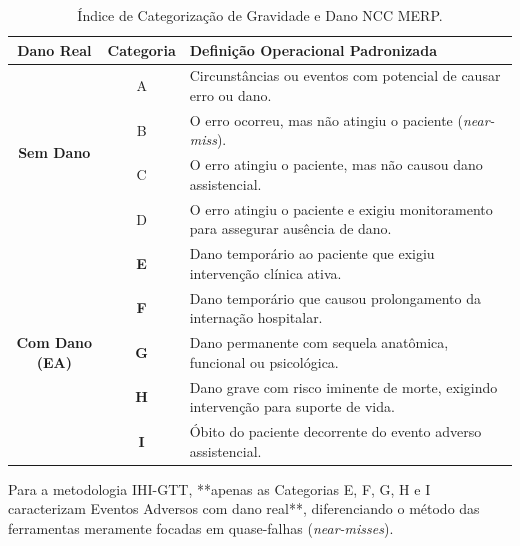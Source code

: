 \begin{table}[htb]
\centering
\caption{Índice de Categorização de Gravidade e Dano NCC MERP.}
\label{tab_ncc_merp}
\begin{tabularx}{\textwidth}{c c X}
\toprule
\textbf{Dano Real} & \textbf{Categoria} & \textbf{Definição Operacional Padronizada} \\
\midrule
\multirow{4}{*}{\textbf{Sem Dano}} 
& A & Circunstâncias ou eventos com potencial de causar erro ou dano. \\
& B & O erro ocorreu, mas não atingiu o paciente (\textit{near-miss}). \\
& C & O erro atingiu o paciente, mas não causou dano assistencial. \\
& D & O erro atingiu o paciente e exigiu monitoramento para assegurar ausência de dano. \\
\midrule
\multirow{5}{*}{\textbf{Com Dano (EA)}} 
& \textbf{E} & Dano temporário ao paciente que exigiu intervenção clínica ativa. \\
& \textbf{F} & Dano temporário que causou prolongamento da internação hospitalar. \\
& \textbf{G} & Dano permanente com sequela anatômica, funcional ou psicológica. \\
& \textbf{H} & Dano grave com risco iminente de morte, exigindo intervenção para suporte de vida. \\
& \textbf{I} & Óbito do paciente decorrente do evento adverso assistencial. \\
\bottomrule
\end{tabularx}
\end{table}

Para a metodologia IHI-GTT, **apenas as Categorias E, F, G, H e I caracterizam Eventos Adversos com dano real**, diferenciando o método das ferramentas meramente focadas em quase-falhas (\textit{near-misses}).

